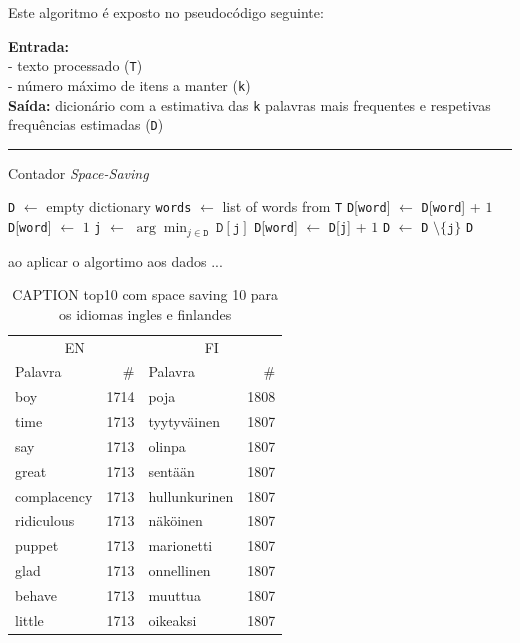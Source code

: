 \documentclass[mirror, portugues]{revdetua}
\begin{document}
Este algoritmo é exposto no pseudocódigo seguinte:

\begin{algorithm}[H]
\raggedright
\textbf{Entrada:} \\
- texto processado (\texttt{T}) \\
- número máximo de itens a manter (\texttt{k}) \\
\textbf{Saída:} dicionário com a estimativa das \texttt{k} palavras mais frequentes e respetivas frequências estimadas (\texttt{D}) \\
\hrule 
\caption{Contador \textit{Space-Saving} \cite{CG09}}
\begin{algorithmic}[1]
    \State \texttt{D} $\gets$ empty dictionary
    \State \texttt{words} $\gets$ list of words from \texttt{T}
            \State \texttt{D}[\texttt{word}] $\gets$ \texttt{D}[\texttt{word}] + $1$
            \State \texttt{D}[\texttt{word}] $\gets$ $1$
        \Else
            \State \texttt{j} $\gets$ $\arg \min_{j \in \texttt{D}}\ \texttt{D}[\texttt{j}]$
            \State \texttt{D}[\texttt{word}] $\gets$ \texttt{D}[\texttt{j}] + $1$
            \State \texttt{D} $\gets$ \texttt{D} $\setminus \{\texttt{j}\}$
        \EndIf
    \EndFor
    \State \Return \texttt{D}
\end{algorithmic}
\end{algorithm}

ao aplicar o algortimo aos dados ...

\begin{table}[H]
\centering
\caption{CAPTION top10 com space saving 10 para os idiomas ingles e finlandes}
\label{table:top10_ss10}
\begin{tabular}{lr|lr}
\toprule
\multicolumn{2}{c}{EN} & \multicolumn{2}{c}{FI} \\
Palavra & \# & Palavra & \# \\
\midrule
boy & 1714 & poja & 1808 \\
time & 1713 & tyytyväinen & 1807 \\
say & 1713 & olinpa & 1807 \\
great & 1713 & sentään & 1807 \\
complacency & 1713 & hullunkurinen & 1807 \\
ridiculous & 1713 & näköinen & 1807 \\
puppet & 1713 & marionetti & 1807 \\
glad & 1713 & onnellinen & 1807 \\
behave & 1713 & muuttua & 1807 \\
little & 1713 & oikeaksi & 1807 \\
\bottomrule
\end{tabular}
\end{table}
\end{document}
